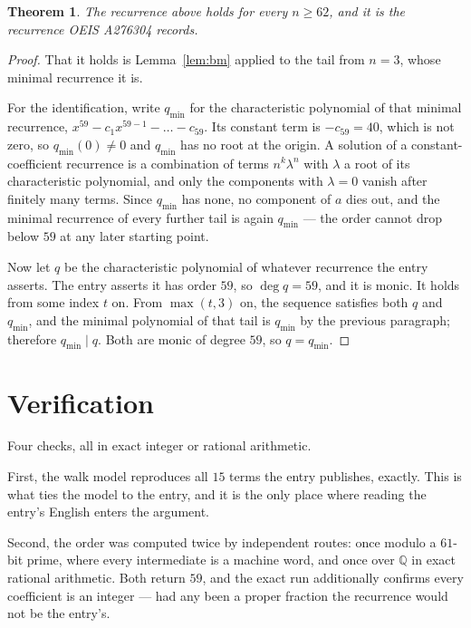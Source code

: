 \documentclass[11pt,a4paper]{article}
\theoremstyle{plain}
\newtheorem{theorem}{Theorem}
\theoremstyle{definition}
\begin{document}
\begin{theorem}
The recurrence above holds for every $n\ge62$, and it is the recurrence OEIS A276304 records.
\end{theorem}

\begin{proof}
That it holds is Lemma~\ref{lem:bm} applied to the tail from $n=3$, whose minimal
recurrence it is.

For the identification, write $q_{\min}$ for the characteristic polynomial of that minimal
recurrence, $x^{59}-c_1x^{59-1}-\dots-c_{59}$. Its constant term is
$-c_{59}=40$, which is not zero, so $q_{\min}(0)\neq0$ and $q_{\min}$ has no
root at the origin. A solution of a constant-coefficient recurrence is a combination of terms
$n^{k}\lambda^{n}$ with $\lambda$ a root of its characteristic polynomial, and only the
components with $\lambda=0$ vanish after finitely many terms. Since $q_{\min}$ has none, no
component of $a$ dies out, and the minimal recurrence of every further tail is again
$q_{\min}$ --- the order cannot drop below $59$ at any later starting point.

Now let $q$ be the characteristic polynomial of whatever recurrence the entry asserts. The
entry asserts it has order $59$, so $\deg q=59$, and it is monic. It holds from some
index $t$ on. From $\max(t,3)$ on, the sequence satisfies both $q$ and $q_{\min}$, and
the minimal polynomial of that tail is $q_{\min}$ by the previous paragraph; therefore
$q_{\min}\mid q$. Both are monic of degree $59$, so $q=q_{\min}$.
\end{proof}

\section{Verification}

Four checks, all in exact integer or rational arithmetic.

First, the walk model reproduces all $15$ terms the entry publishes, exactly. This is
what ties the model to the entry, and it is the only place where reading the entry's English
enters the argument.

Second, the order was computed twice by independent routes: once modulo a $61$-bit prime, where
every intermediate is a machine word, and once over $\mathbb{Q}$ in exact rational arithmetic.
Both return $59$, and the exact run additionally confirms every coefficient is an integer
--- had any been a proper fraction the recurrence would not be the entry's.
\end{document}
